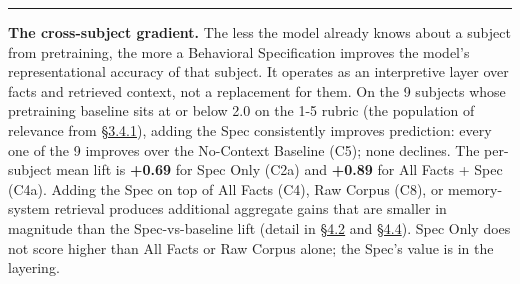 \begin{center}\rule{0.5\linewidth}{0.5pt}\end{center}

\textbf{The cross-subject gradient.} The less the model already knows
about a subject from pretraining, the more a Behavioral Specification
improves the model's representational accuracy of that subject. It
operates as an interpretive layer over facts and retrieved context, not
a replacement for them. On the 9 subjects whose pretraining baseline
sits at or below 2.0 on the 1-5 rubric (the population of relevance from
\hyperref[pretraining-coverage-variance-high-vs-low-baseline]{§3.4.1}), adding the Spec consistently improves prediction: every one of
the 9 improves over the No-Context Baseline (C5); none declines. The
per-subject mean lift is \textbf{+0.69} for Spec Only (C2a) and
\textbf{+0.89} for All Facts + Spec (C4a). Adding the Spec on top of All
Facts (C4), Raw Corpus (C8), or memory-system retrieval produces
additional aggregate gains that are smaller in magnitude than the
Spec-vs-baseline lift (detail in \hyperref[compression-structure-vs.-raw-text]{§4.2} and \hyperref[memory-system-composition]{§4.4}). Spec Only does not
score higher than All Facts or Raw Corpus alone; the Spec's value is in
the layering.

